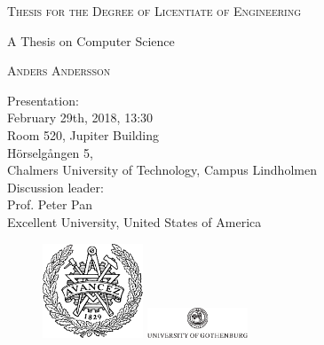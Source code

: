 \documentclass[10pt,a4paper,onecolumn,english]{book}
\newcommand{\currentyear}{2018}
\newcommand{\authorname}{Anders Andersson}
\newcommand{\mytitle}{A Thesis on Computer Science}
\newcommand{\degreetitle}{Licentiate of Engineering}
\begin{document}
\frontmatter


\thispagestyle{empty} %
\begin{center}
  \textsc{Thesis for the Degree of \degreetitle}\\
\end{center}

\vspace{1.5cm}
\begin{center} \Large \mytitle
\end{center}

\vspace{1cm}
\begin{center}
\textsc{\authorname} \\
\end{center}

\vspace{1cm}
\begin{center}
Presentation:\\
February 29th, \currentyear, 13:30\\
Room 520, Jupiter Building \\
H\"{o}rselg\aa ngen 5,\\ 
Chalmers University of Technology, Campus Lindholmen\\
\vspace{1cm}
Discussion leader:\\
Prof. Peter Pan\\
Excellent University, United States of America

\end{center}


\vspace{1cm}
\begin{figure}[h]
  \begin{center}
     \includegraphics[width=30mm]{Fig/Avancez50PC.pdf}
     \hspace{1cm}
     \includegraphics[width=30mm]{Fig/GU.pdf}
  \end{center}
\end{figure}
\vspace{1cm}
\end{document}
